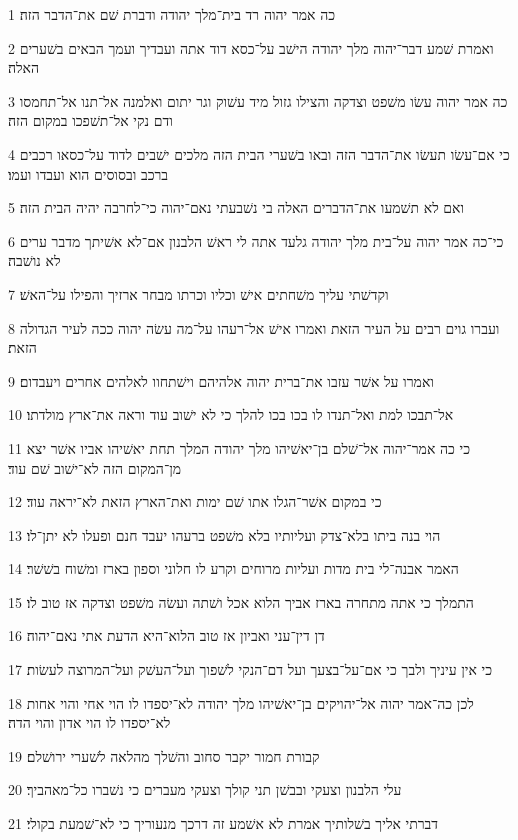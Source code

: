 \par 1 כה אמר יהוה רד בית־מלך יהודה ודברת שׁם את־הדבר הזה׃
\par 2 ואמרת שׁמע דבר־יהוה מלך יהודה הישׁב על־כסא דוד אתה ועבדיך ועמך הבאים בשׁערים האלה׃
\par 3 כה אמר יהוה עשׂו משׁפט וצדקה והצילו גזול מיד עשׁוק וגר יתום ואלמנה אל־תנו אל־תחמסו ודם נקי אל־תשׁפכו במקום הזה׃
\par 4 כי אם־עשׂו תעשׂו את־הדבר הזה ובאו בשׁערי הבית הזה מלכים ישׁבים לדוד על־כסאו רכבים ברכב ובסוסים הוא ועבדו ועמו׃
\par 5 ואם לא תשׁמעו את־הדברים האלה בי נשׁבעתי נאם־יהוה כי־לחרבה יהיה הבית הזה׃
\par 6 כי־כה אמר יהוה על־בית מלך יהודה גלעד אתה לי ראשׁ הלבנון אם־לא אשׁיתך מדבר ערים לא נושׁבה׃
\par 7 וקדשׁתי עליך משׁחתים אישׁ וכליו וכרתו מבחר ארזיך והפילו על־האשׁ׃
\par 8 ועברו גוים רבים על העיר הזאת ואמרו אישׁ אל־רעהו על־מה עשׂה יהוה ככה לעיר הגדולה הזאת׃
\par 9 ואמרו על אשׁר עזבו את־ברית יהוה אלהיהם וישׁתחוו לאלהים אחרים ויעבדום׃
\par 10 אל־תבכו למת ואל־תנדו לו בכו בכו להלך כי לא ישׁוב עוד וראה את־ארץ מולדתו׃
\par 11 כי כה אמר־יהוה אל־שׁלם בן־יאשׁיהו מלך יהודה המלך תחת יאשׁיהו אביו אשׁר יצא מן־המקום הזה לא־ישׁוב שׁם עוד׃
\par 12 כי במקום אשׁר־הגלו אתו שׁם ימות ואת־הארץ הזאת לא־יראה עוד׃
\par 13 הוי בנה ביתו בלא־צדק ועליותיו בלא משׁפט ברעהו יעבד חנם ופעלו לא יתן־לו׃
\par 14 האמר אבנה־לי בית מדות ועליות מרוחים וקרע לו חלוני וספון בארז ומשׁוח בשׁשׁר׃
\par 15 התמלך כי אתה מתחרה בארז אביך הלוא אכל ושׁתה ועשׂה משׁפט וצדקה אז טוב לו׃
\par 16 דן דין־עני ואביון אז טוב הלוא־היא הדעת אתי נאם־יהוה׃
\par 17 כי אין עיניך ולבך כי אם־על־בצעך ועל דם־הנקי לשׁפוך ועל־העשׁק ועל־המרוצה לעשׂות׃
\par 18 לכן כה־אמר יהוה אל־יהויקים בן־יאשׁיהו מלך יהודה לא־יספדו לו הוי אחי והוי אחות לא־יספדו לו הוי אדון והוי הדה׃
\par 19 קבורת חמור יקבר סחוב והשׁלך מהלאה לשׁערי ירושׁלם׃
\par 20 עלי הלבנון וצעקי ובבשׁן תני קולך וצעקי מעברים כי נשׁברו כל־מאהביך׃
\par 21 דברתי אליך בשׁלותיך אמרת לא אשׁמע זה דרכך מנעוריך כי לא־שׁמעת בקולי׃

